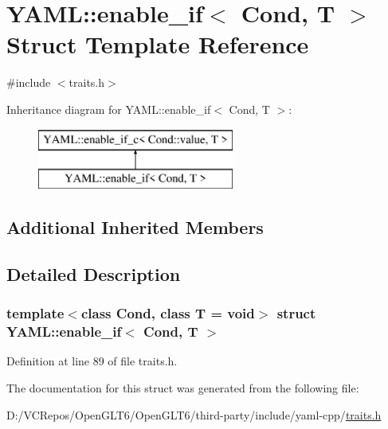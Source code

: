 \hypertarget{struct_y_a_m_l_1_1enable__if}{}\section{Y\+A\+ML\+::enable\+\_\+if$<$ Cond, T $>$ Struct Template Reference}
\label{struct_y_a_m_l_1_1enable__if}


{\ttfamily \#include $<$traits.\+h$>$}

Inheritance diagram for Y\+A\+ML\+::enable\+\_\+if$<$ Cond, T $>$\+:\begin{figure}[H]
\begin{center}
\leavevmode
\includegraphics[height=2.000000cm]{struct_y_a_m_l_1_1enable__if}
\end{center}
\end{figure}
\subsection*{Additional Inherited Members}


\subsection{Detailed Description}
\subsubsection*{template$<$class Cond, class T = void$>$\newline
struct Y\+A\+M\+L\+::enable\+\_\+if$<$ Cond, T $>$}



Definition at line 89 of file traits.\+h.



The documentation for this struct was generated from the following file\+:\begin{DoxyCompactItemize}
\item 
D\+:/\+V\+C\+Repos/\+Open\+G\+L\+T6/\+Open\+G\+L\+T6/third-\/party/include/yaml-\/cpp/\mbox{\hyperlink{traits_8h}{traits.\+h}}\end{DoxyCompactItemize}
